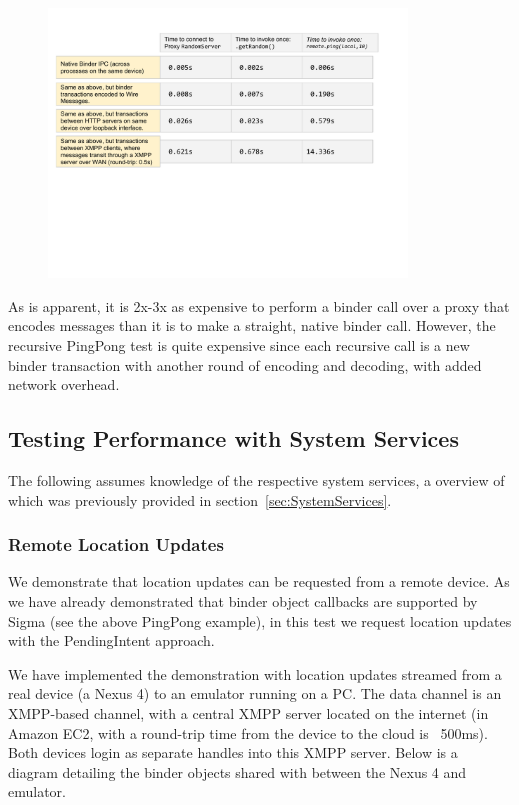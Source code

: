 \documentclass[prodmode]{acmlarge}
\begin{document}
\begin{figure}[h]
\centering
\includegraphics[width=0.85\textwidth]{drawings/Performance.pdf}
\end{figure}

As is apparent, it is 2x-3x as expensive to perform a binder call over a proxy that encodes messages than it is to make a straight, native binder call. However, the recursive PingPong test is quite expensive since each recursive call is a new binder transaction with another round of encoding and decoding, with added network overhead.

\subsection{Testing Performance with System Services}

The following assumes knowledge of the respective system services, a overview of which was previously provided in section~\ref{sec:SystemServices}.

\subsubsection{Remote Location Updates}
\label{sec:location_sharing}
We demonstrate that location updates can be requested from a remote device. As we have already demonstrated that binder object callbacks are supported by Sigma (see the above PingPong example), in this test we request location updates with the PendingIntent approach.

We have implemented the demonstration with location updates streamed from a real device (a Nexus 4) to an emulator running on a PC. The data channel is an XMPP-based channel, with a central XMPP server located on the internet (in Amazon EC2, with a round-trip time from the device to the cloud is ~500ms). Both devices login as separate handles into this XMPP server.
Below is a diagram detailing the binder objects shared with between the Nexus 4 and emulator.
\end{document}

